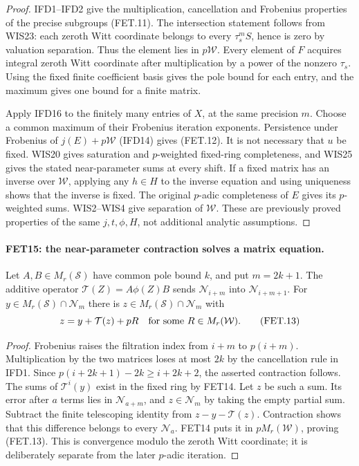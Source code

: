 \begin{proof}
IFD1--IFD2 give the multiplication, cancellation and Frobenius
properties of the precise subgroups (FET.11).
The intersection statement follows from WIS23: each zeroth Witt
coordinate belongs to every $\tau_s^m S$, hence is zero by
valuation separation. Thus the element lies in $p\mathcal W$.
Every element of $F$ acquires integral zeroth Witt coordinate
after multiplication by a power of the nonzero $\tau_s$.
Using the fixed finite coefficient basis gives the pole bound for
each entry, and the maximum gives one bound for a finite matrix.

Apply IFD16 to the finitely many entries of $X$, at the same
precision $m$. Choose a common maximum of their Frobenius
iteration exponents. Persistence under Frobenius of $j(E)+p\mathcal W$
(IFD14) gives (FET.12). It is not necessary that $u$ be fixed.
WIS20 gives saturation and $p$-weighted fixed-ring completeness,
and WIS25 gives the stated near-parameter sums at every shift.
If a fixed matrix has an inverse over $\mathcal W$, applying any
$h\in H$ to the inverse equation and using uniqueness shows that
the inverse is fixed. The original $p$-adic completeness of $E$
gives its $p$-weighted sums. WIS2--WIS4 give separation of
$\mathcal W$. These are previously proved properties of the
same $j,t,\phi,H$, not additional analytic assumptions.
\end{proof}

\paragraph{FET15: the near-parameter contraction solves a matrix equation.}
\label{claim:FET15}
Let $A,B\in M_r(\mathcal S)$ have common pole bound $k$,
and put $m=2k+1$. The additive operator
$\mathcal T(Z)=A\phi(Z)B$ sends
$\mathcal N_{i+m}$ into $\mathcal N_{i+m+1}$.
For $y\in M_r(\mathcal S)\cap\mathcal N_m$ there is
$z\in M_r(\mathcal S)\cap\mathcal N_m$ with
\[
                         z=y+\mathcal T(z)+pR
                      \quad\hbox{for some }R\in M_r(\mathcal W).
                                                               \tag{FET.13}
\]

\begin{proof}
Frobenius raises the filtration index from $i+m$ to $p(i+m)$.
Multiplication by the two matrices loses at most $2k$ by the
cancellation rule in IFD1. Since
$p(i+2k+1)-2k\geq i+2k+2$, the asserted contraction follows.
The sums of $\mathcal T^i(y)$ exist in the fixed ring by FET14.
Let $z$ be such a sum. Its error after $a$ terms lies in
$\mathcal N_{a+m}$, and $z\in\mathcal N_m$ by taking the
empty partial sum. Subtract the finite telescoping identity
from $z-y-\mathcal T(z)$. Contraction shows that this difference
belongs to every $\mathcal N_a$. FET14 puts it in
$pM_r(\mathcal W)$, proving (FET.13).
This is convergence modulo the zeroth Witt coordinate; it is
deliberately separate from the later $p$-adic iteration.
\end{proof}

